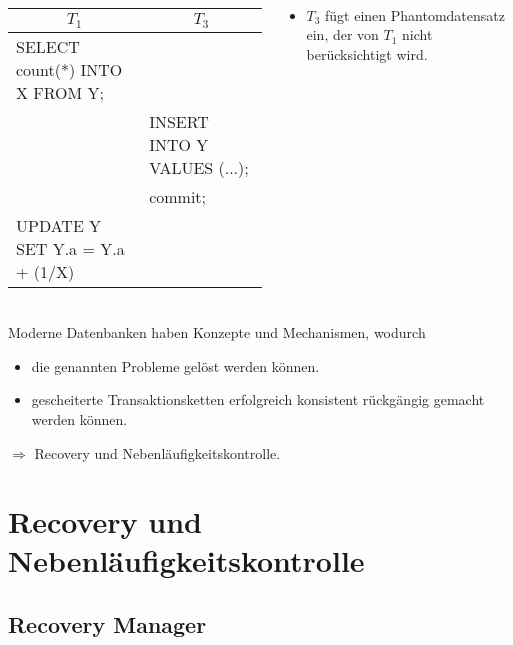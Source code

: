 \begin{frame}{\insertsection}
	\framesubtitle{\insertsubsection}
	\begin{columns}
		\begin{column}{.48\textwidth}
			\begin{tabular}{p{3.0cm}|p{3.0cm}}
				\multicolumn{1}{c|}{$T_1$} & \multicolumn{1}{c}{$T_3$}\\\hline
				SELECT count(*) INTO X FROM Y; & \\
				& INSERT INTO Y VALUES (...);\\
				& commit;\\
				UPDATE Y SET Y.a = Y.a + (1/X) &   \\\hline
			\end{tabular}
		\end{column}
		\begin{column}{.48\textwidth}
			\begin{itemize}
				\item $T_3$ fügt einen Phantomdatensatz ein, der von $T_1$ nicht berücksichtigt wird. 
			\end{itemize}
		\end{column}
	\end{columns}
\end{frame}

\begin{frame}{\insertsection}
\framesubtitle{\insertsubsection}
Moderne Datenbanken haben Konzepte und Mechanismen, wodurch
\begin{itemize}
	\item die genannten Probleme gel\"ost werden k\"onnen.
	\item gescheiterte Transaktionsketten erfolgreich konsistent r\"uckg\"angig gemacht werden k\"onnen.
\end{itemize}
\abs
$\Rightarrow$ Recovery und Nebenläufigkeitskontrolle.
\end{frame}

\section{Recovery und Nebenläufigkeitskontrolle}\label{sec:recovery}
\subsection{Recovery Manager}

